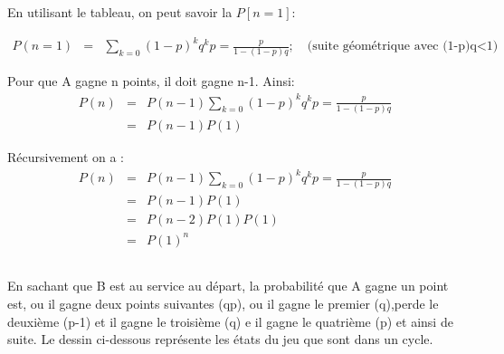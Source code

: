 \documentclass[a4paper]{article}
\begin{document}
En utilisant le tableau, on peut savoir la $P[n=1]$:

\begin{eqnarray*}
  P(n=1)  &  =  &  \sum_{k=0}(1-p)^kq^kp= \frac{p}{1-(1-p)q}  ;\quad  \text{(suite
    géométrique avec (1-p)q<1) }
\end{eqnarray*}

Pour que A gagne n points, il doit gagne n-1. Ainsi:
\begin{eqnarray*}
  P(n) & = &P(n-1)\sum_{k=0}(1-p)^kq^kp= \frac{p}{1-(1-p)q}\\
  & = &P(n-1)P(1)
\end{eqnarray*}

Récursivement on a :
\begin{eqnarray*}
  P(n) & = &P(n-1)\sum_{k=0}(1-p)^kq^kp= \frac{p}{1-(1-p)q}\\
  & = &P(n-1)P(1)\\
  & = &P(n-2)P(1)P(1)\\
  & = &P(1)^n
\end{eqnarray*}

\subsection{}

En sachant que B  est au service au départ, la probabilité  que A gagne un point
est, ou il gagne deux points suivantes (qp), ou il gagne le premier (q),perde le
deuxième (p-1) et il gagne le
troisième (q) e il gagne le quatrième (p) et ainsi de suite. Le dessin ci-dessous
représente les états du jeu que sont dans un cycle.

\end{document}
